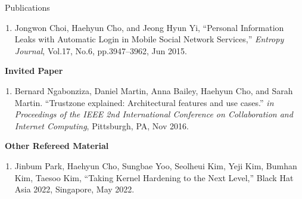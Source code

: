 \documentclass{resume} %
\begin{document}
\begin{rSection}{\faGenderless~Publications}
\begin{enumerate}[leftmargin=0pt]
		\item Jongwon Choi, {Haehyun Cho}, and Jeong Hyun Yi, 
		``Personal Information Leaks with Automatic Login in Mobile Social Network Services,'' 
		\emph{Entropy Journal}, 
		Vol.17, No.6, pp.3947--3962, Jun 2015.
	\end{enumerate}
    \vspace{3mm}

   
    \strut\textbullet~{\bf Invited Paper}
    \begin{enumerate}[leftmargin=0pt]
        \item Bernard Ngabonziza, Daniel Martin, Anna Bailey, {Haehyun Cho}, and Sarah Martin.
        ``Trustzone explained: Architectural features and use cases.''
        \emph{in Proceedings of the IEEE 2nd International Conference on Collaboration and Internet Computing}, 
        Pittsburgh, PA, Nov 2016.    
    \end{enumerate}
	\vspace{3mm}


	\strut\textbullet~{\bf Other Refereed Material}
	\begin{enumerate}[leftmargin=0pt]
		\item Jinbum Park, {Haehyun Cho}, Sungbae Yoo, Seolheui Kim, Yeji Kim, Bumhan Kim, Taesoo Kim,
		``Taking Kernel Hardening to the Next Level,''
		Black Hat Asia 2022, Singapore, May 2022.
	\end{enumerate}
	
	\vspace{3mm}
\end{rSection}


	

	
\end{document}
